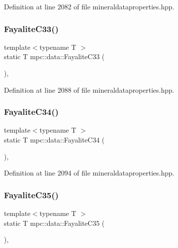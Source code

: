 Definition at line 2082 of file mineraldataproperties.\+hpp.

\mbox{\label{namespacempc_1_1data_a84e780a3fcfd74670c452f9e43e71c93}} 
\subsubsection{\texorpdfstring{Fayalite\+C33()}{FayaliteC33()}}
{\footnotesize\ttfamily template$<$typename T $>$ \\
static T mpc\+::data\+::\+Fayalite\+C33 (\begin{DoxyParamCaption}{ }\end{DoxyParamCaption})\hspace{0.3cm}{\ttfamily [inline]}, {\ttfamily [static]}}



Definition at line 2088 of file mineraldataproperties.\+hpp.

\mbox{\label{namespacempc_1_1data_a7ad2f1862d4cb2124ea914313563f252}} 
\subsubsection{\texorpdfstring{Fayalite\+C34()}{FayaliteC34()}}
{\footnotesize\ttfamily template$<$typename T $>$ \\
static T mpc\+::data\+::\+Fayalite\+C34 (\begin{DoxyParamCaption}{ }\end{DoxyParamCaption})\hspace{0.3cm}{\ttfamily [inline]}, {\ttfamily [static]}}



Definition at line 2094 of file mineraldataproperties.\+hpp.

\mbox{\label{namespacempc_1_1data_aec3aba2bc3177016cf9d71885d274434}} 
\subsubsection{\texorpdfstring{Fayalite\+C35()}{FayaliteC35()}}
{\footnotesize\ttfamily template$<$typename T $>$ \\
static T mpc\+::data\+::\+Fayalite\+C35 (\begin{DoxyParamCaption}{ }\end{DoxyParamCaption})\hspace{0.3cm}{\ttfamily [inline]}, {\ttfamily [static]}}



